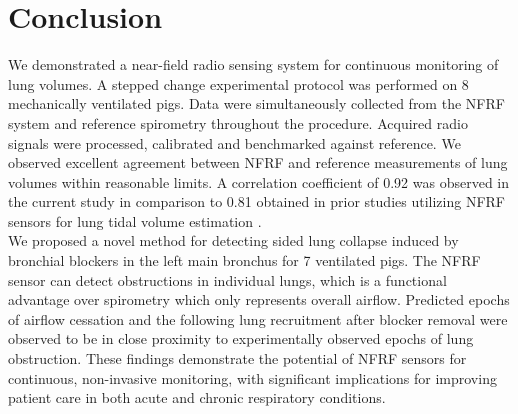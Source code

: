 \documentclass[journal]{IEEEtran}
\begin{document}
\section{Conclusion}
We demonstrated a near-field radio sensing system for continuous monitoring of lung volumes. A stepped change experimental protocol was performed on 8 mechanically ventilated pigs. Data were simultaneously collected from the NFRF system and reference spirometry throughout the procedure. Acquired radio signals were processed, calibrated and benchmarked against reference. We observed excellent agreement between NFRF and reference measurements of lung volumes within reasonable limits. A correlation coefficient of 0.92 was observed in the current study in comparison to 0.81 obtained in prior studies utilizing NFRF sensors for lung tidal volume estimation \cite{sharmaWearableRadiofrequencySensing2020}. \\
We proposed a novel method for detecting sided lung collapse induced by bronchial blockers in the left main bronchus for 7 ventilated pigs. The NFRF sensor can detect obstructions in individual lungs, which is a functional advantage over spirometry which only represents overall airflow. Predicted epochs of airflow cessation and the following lung recruitment after blocker removal were observed to be in close proximity to experimentally observed epochs of lung obstruction. These findings demonstrate the potential of NFRF sensors for continuous, non-invasive monitoring, with significant implications for improving patient care in both acute and chronic respiratory conditions.


%
\end{document}
